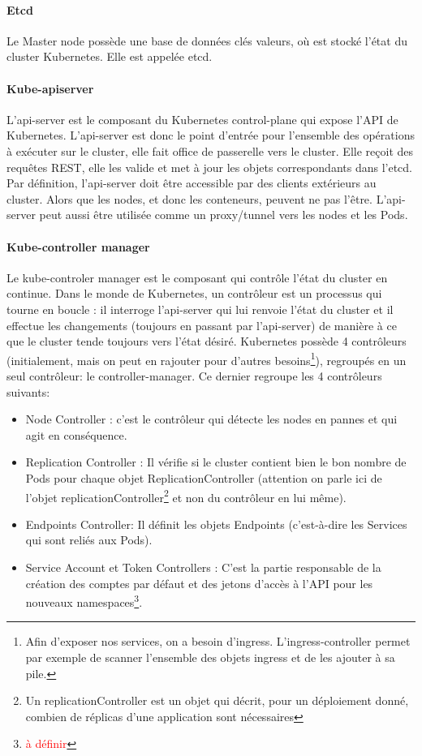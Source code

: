 \documentclass[11pt,fleqn]{book} %
\begin{document}
\paragraph{Etcd}
Le Master node possède une base de données clés valeurs, où est stocké l'état du cluster Kubernetes. Elle est appelée etcd.

\paragraph{Kube-apiserver}
L'api-server est le composant du Kubernetes control-plane qui expose l'API de Kubernetes. L'api-server est donc le point d'entrée pour l'ensemble des opérations à exécuter sur le cluster, elle fait office de passerelle vers le cluster. Elle reçoit des requêtes REST, elle les valide et met à jour les objets correspondants dans l'etcd. Par définition, l'api-server doit être accessible par des clients extérieurs au cluster. Alors que les nodes, et donc les conteneurs, peuvent ne pas l'être. L'api-server peut aussi être utilisée comme un proxy/tunnel vers les nodes et les Pods.


\paragraph{Kube-controller manager}
Le kube-controler manager est le composant qui contrôle l'état du cluster en continue. Dans le monde de Kubernetes, un contrôleur est un processus qui tourne en boucle : il interroge l'api-server qui lui renvoie l'état du cluster et il effectue les changements (toujours en passant par l'api-server) de manière à ce que le cluster tende toujours vers l'état désiré. Kubernetes possède 4 contrôleurs (initialement, mais on peut en rajouter pour d'autres besoins\footnote{Afin d'exposer nos services, on a besoin d'ingress. L'ingress-controller permet par exemple de scanner l'ensemble des objets ingress et de les ajouter à sa pile.}), regroupés en un seul contrôleur: le controller-manager. Ce dernier regroupe les 4 contrôleurs suivants: 
\begin{itemize}
    \item Node Controller : c'est le contrôleur qui détecte les nodes en pannes et qui agit en conséquence.
    \item Replication Controller : Il vérifie si le cluster contient bien le bon nombre de Pods pour chaque objet ReplicationController (attention on parle ici de l'objet replicationController\footnote{Un replicationController est un objet qui décrit, pour un déploiement donné, combien de réplicas d'une application sont nécessaires} et non du contrôleur en lui même).
    \item Endpoints Controller: Il définit les objets Endpoints (c’est-à-dire les Services qui sont reliés aux Pods).
    \item Service Account et Token Controllers : C'est la partie responsable de la création des comptes par défaut et des jetons d'accès à l'API pour les nouveaux namespaces\footnote{\textcolor{red}{à définir}}.
\end{itemize}
\end{document}
